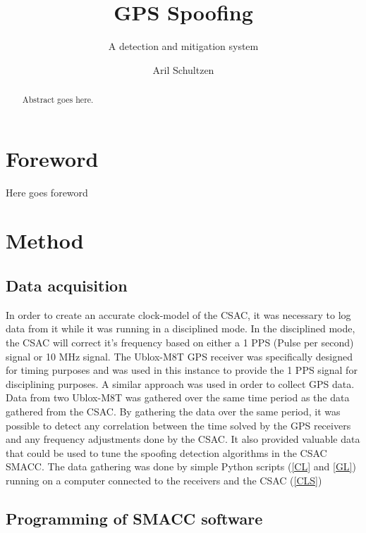 \documentclass[12pt,english,a4paper]{report}
\title{GPS Spoofing}
\subtitle{A detection and mitigation system}
\author{Aril Schultzen}
\begin{document}
\duoforside[dept={Institutt for informatikk},
program={Informatikk: programmering og nettverk},
long]

\begin{abstract}
Abstract goes here.
\end{abstract}

\chapter*{Foreword}
Here goes foreword

\thispagestyle{empty}
\setcounter{page}{0}
\tableofcontents
\thispagestyle{empty}
\setcounter{page}{0}
\thispagestyle{empty}
\setcounter{page}{0}
\clearpage
\setcounter{page}{1}





\newpage
\chapter{Method}
\section{Data acquisition}
In order to create an accurate clock-model of the CSAC, it was necessary to log data from it while it was running in a disciplined mode. In the disciplined mode, the CSAC will correct it's frequency based on either a 1 PPS (Pulse per second) signal or 10 MHz signal. The Ublox-M8T GPS receiver was specifically designed for timing purposes and was used in this instance to provide the 1 PPS signal for disciplining purposes. A similar approach was used in order to collect GPS data. Data from two Ublox-M8T was gathered over the same time period as the data gathered from the CSAC. By gathering the data over the same period, it was possible to detect any correlation between the time solved by the GPS receivers and any frequency adjustments done by the CSAC. It also provided valuable data that could be used to tune the spoofing detection algorithms in the CSAC SMACC. The data gathering was done by simple Python scripts (\ref{CL} and \ref{GL}) running on a computer connected to the receivers and the CSAC (\ref{CLS})

\newpage
\section{Programming of SMACC software}
\end{document}
